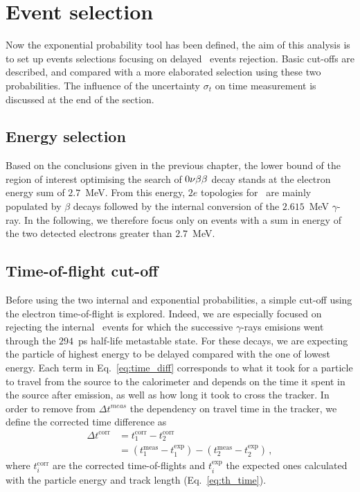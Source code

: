 \section{Event selection}
\label{sec:ev_selection}


Now the exponential probability tool has been defined, the aim of this analysis is to set up events selections focusing on delayed \Tl\ events rejection.
Basic cut-offs are described, and compared with a more elaborated selection using these two probabilities.
The influence of the uncertainty $\sigma_{t}$ on time measurement is discussed at the end of the section.

\subsection{Energy selection}

Based on the conclusions given in the previous chapter, the lower bound of the region of interest optimising the search of $0\nu\beta\beta$ decay stands at the electron energy sum of $2.7$~MeV.
From this energy, $2e$ topologies for \Tl\ are mainly populated by $\beta$ decays followed by the internal conversion of the $2.615$~MeV $\gamma$-ray.
In the following, we therefore focus only on events with a sum in energy of the two detected electrons greater than $2.7$~MeV.

\subsection{Time-of-flight cut-off}
\label{subsec:tof_cutoff}

Before using the two internal and exponential probabilities, a simple cut-off using the electron time-of-flight is explored.
Indeed, we are especially focused on rejecting the internal \Tl\ events for which the successive $\gamma$-rays emisions went through the $294$~ps half-life metastable state.
For these decays, we are expecting the particle of highest energy to be delayed compared with the one of lowest energy.
Each term in Eq.~\ref{eq:time_diff} corresponds to what it took for a particle to travel from the source to the calorimeter and depends on the time it spent in the source after emission, as well as how long it took to cross the tracker.
In order to remove from $\Delta t^{meas}$ the dependency on travel time in the tracker, we define the corrected time difference as
\begin{align}
  \Delta t^{\text{corr}} & = t^{\text{corr}}_{1} - t^{\text{corr}}_{2}\\
  & = (t^{\text{meas}}_{1} - t^{\text{exp}}_{1}) - (t^{\text{meas}}_{2} - t^{\text{exp}}_{2})\,,
\end{align}
where $t^{\text{corr}}_{i}$ are the corrected time-of-flights and $t^{\text{exp}}_{i}$ the expected ones calculated with the particle energy and track length (Eq.~\ref{eq:th_time}).

